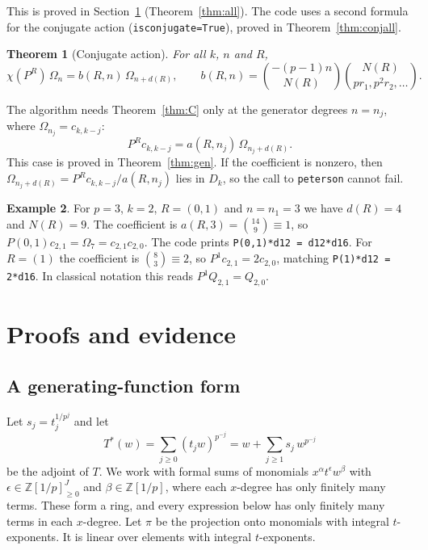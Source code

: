 \documentclass[11pt]{amsart}
\newtheorem{theorem}{Theorem}[section]
\theoremstyle{definition}
\newtheorem{example}[theorem]{Example}
\theoremstyle{remark}
\newcommand{\Dk}{D_k}
\newcommand{\code}[1]{\texttt{#1}}
\begin{document}
This is proved in Section~\ref{sec:proof} (Theorem~\ref{thm:all}).  The code
uses a second formula for the conjugate action (\code{isconjugate=True}),
proved in Theorem~\ref{thm:conjall}.

\begin{theorem}[Conjugate action]\label{thm:conjact}
For all $k$, $n$ and $R$,
\[
  \chi(P^R)\,\Omega_n=b(R,n)\,\Omega_{n+d(R)},\qquad
  b(R,n)=\binom{-(p-1)n}{N(R)}\binom{N(R)}{pr_1,p^2r_2,\dots}.
\]
\end{theorem}

The algorithm needs Theorem~\ref{thm:C} only at the generator degrees
$n=n_j$, where $\Omega_{n_j}=c_{k,k-j}$:
\begin{equation}\label{eq:gen}
  P^R c_{k,k-j}=a(R,n_j)\,\Omega_{n_j+d(R)} .
\end{equation}
This case is proved in Theorem~\ref{thm:gen}.  If the coefficient is nonzero,
then $\Omega_{n_j+d(R)}=P^Rc_{k,k-j}/a(R,n_j)$ lies in $\Dk$, so the call to
\code{peterson} cannot fail.

\begin{example}
For $p=3$, $k=2$, $R=(0,1)$ and $n=n_1=3$ we have $d(R)=4$ and $N(R)=9$.  The
coefficient is $a(R,3)=\binom{14}{9}\equiv1$, so
$P(0,1)c_{2,1}=\Omega_7=c_{2,1}c_{2,0}$.  The code prints
\code{P(0,1)*d12 = d12*d16}.  For $R=(1)$ the coefficient is
$\binom{8}{3}\equiv2$, so $P^1c_{2,1}=2c_{2,0}$, matching
\code{P(1)*d12 = 2*d16}.  In classical notation this reads
$P^1Q_{2,1}=Q_{2,0}$.
\end{example}

\section{Proofs and evidence}\label{sec:proof}

\subsection{A generating-function form}
Let $s_j=t_j^{1/p^j}$ and let
\[
  T^*(w)=\sum_{j\ge0}(t_jw)^{p^{-j}}=w+\sum_{j\ge1}s_j\,w^{p^{-j}}
\]
be the adjoint of $T$.  We work with formal sums of monomials
$x^\alpha t^\epsilon w^\beta$ with $\epsilon\in\mathbb{Z}[1/p]_{\ge0}^{J}$ and
$\beta\in\mathbb{Z}[1/p]$, where each $x$-degree has only finitely many terms.
These form a ring, and every expression below has only finitely many terms in
each $x$-degree.  Let $\pi$ be the projection onto monomials with integral
$t$-exponents.  It is linear over elements with integral $t$-exponents.
\end{document}
